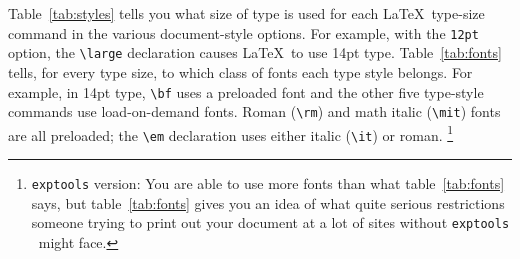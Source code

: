Table~\ref{tab:styles} tells you what size of type is used for each
\LaTeX\ type-size command in the various document-style options.  For
example, with the {\tt 12pt} option, the \hbox{\verb|\large|}
declaration causes \LaTeX\ to use 14pt type.  Table~\ref{tab:fonts}
tells, for every type size, to which class of fonts each type style
belongs.  For example, in 14pt type, \verb|\bf| uses a preloaded
font and the other five type-style commands use load-on-demand fonts.
Roman (\verb|\rm|) and math italic (\verb|\mit|) fonts are all
preloaded; the \hbox{\verb|\em|} declaration uses either italic
(\verb|\it|) or roman.
\footnote{
{\tt exptools} version: You are able to use more fonts than what
table~\ref{tab:fonts} says, but table~\ref{tab:fonts} gives you an
idea of what quite serious restrictions someone trying to print out your document at
a lot of sites without {\tt exptools} \LittleLaTeX\ might face.  }





%
%
%
%
%

